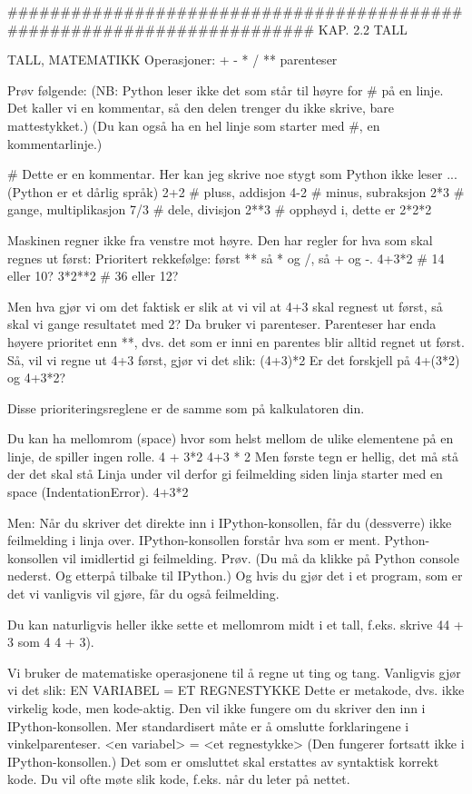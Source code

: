 \iffalse

######################################################################## 
KAP. 2.2  TALL

TALL, MATEMATIKK
Operasjoner: + - * / ** parenteser

Prøv følgende:
(NB: Python leser ikke det som står til høyre for # på en linje.
Det kaller vi en kommentar, så den delen trenger du ikke skrive, bare mattestykket.)
(Du kan også ha en hel linje som starter med #, en kommentarlinje.) 

# Dette er en kommentar. Her kan jeg skrive noe stygt som Python ikke leser ... (Python er et dårlig språk) 
2+2   # pluss, addisjon
4-2   # minus, subraksjon
2*3   # gange, multiplikasjon
7/3   # dele, divisjon
2**3  # opphøyd i, dette er 2*2*2

Maskinen regner ikke fra venstre mot høyre. 
Den har regler for hva som skal regnes ut først: 
Prioritert rekkefølge: først ** så * og /, så + og -. 
4+3*2   # 14 eller 10? 
3*2**2  # 36 eller 12?

Men hva gjør vi om det faktisk er slik at vi vil at 4+3 skal regnest ut først,
så skal vi gange resultatet med 2? 
Da bruker vi parenteser. Parenteser har enda høyere prioritet enn **,
dvs. det som er inni en parentes blir alltid regnet ut først.
Så, vil vi regne ut 4+3 først, gjør vi det slik: 
(4+3)*2 
Er det forskjell på 4+(3*2) og 4+3*2? 

Disse prioriteringsreglene er de samme som på kalkulatoren din. 

Du kan ha mellomrom (space) hvor som helst mellom de ulike elementene på en linje,
de spiller ingen rolle. 
4 + 3*2
4+3 * 2 
Men første tegn er hellig, det må stå der det skal stå 
Linja under vil derfor gi feilmelding siden linja starter med en space (IndentationError). 
 4+3*2

Men: Når du skriver det direkte inn i IPython-konsollen, får du (dessverre) ikke
feilmelding i linja over.
IPython-konsollen forstår hva som er ment.
Python-konsollen vil imidlertid gi feilmelding.
Prøv. (Du må da klikke på Python console nederst. Og etterpå tilbake til IPython.) 
Og hvis du gjør det i et program, som er det vi vanligvis vil gjøre, får du også feilmelding. 

Du kan naturligvis heller ikke sette et mellomrom midt i et tall,
f.eks. skrive 44 + 3 som 4 4 + 3). 



Vi bruker de matematiske operasjonene til å regne ut ting og tang.
Vanligvis gjør vi det slik:
EN VARIABEL = ET REGNESTYKKE
Dette er metakode, dvs. ikke virkelig kode, men kode-aktig. 
Den vil ikke fungere om du skriver den inn i IPython-konsollen.
Mer standardisert måte er å omslutte forklaringene i vinkelparenteser.
<en variabel> = <et regnestykke> 
(Den fungerer fortsatt ikke i IPython-konsollen.)
Det som er omsluttet skal erstattes av syntaktisk korrekt kode.
Du vil ofte møte slik kode, f.eks. når du leter på nettet.


